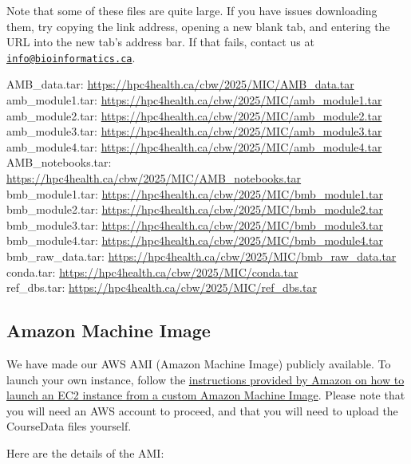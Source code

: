 \documentclass[
]{book}
\begin{document}
Note that some of these files are quite large. If you have issues downloading them, try copying the link address, opening a new blank tab, and entering the URL into the new tab's address bar. If that fails, contact us at \href{mailto:info@bioinformatics.ca}{\nolinkurl{info@bioinformatics.ca}}.

AMB\_data.tar: \url{https://hpc4health.ca/cbw/2025/MIC/AMB_data.tar}\\
amb\_module1.tar: \url{https://hpc4health.ca/cbw/2025/MIC/amb_module1.tar}\\
amb\_module2.tar: \url{https://hpc4health.ca/cbw/2025/MIC/amb_module2.tar}\\
amb\_module3.tar: \url{https://hpc4health.ca/cbw/2025/MIC/amb_module3.tar}\\
amb\_module4.tar: \url{https://hpc4health.ca/cbw/2025/MIC/amb_module4.tar}\\
AMB\_notebooks.tar: \url{https://hpc4health.ca/cbw/2025/MIC/AMB_notebooks.tar}\\
bmb\_module1.tar: \url{https://hpc4health.ca/cbw/2025/MIC/bmb_module1.tar}\\
bmb\_module2.tar: \url{https://hpc4health.ca/cbw/2025/MIC/bmb_module2.tar}\\
bmb\_module3.tar: \url{https://hpc4health.ca/cbw/2025/MIC/bmb_module3.tar}\\
bmb\_module4.tar: \url{https://hpc4health.ca/cbw/2025/MIC/bmb_module4.tar}\\
bmb\_raw\_data.tar: \url{https://hpc4health.ca/cbw/2025/MIC/bmb_raw_data.tar}\\
conda.tar: \url{https://hpc4health.ca/cbw/2025/MIC/conda.tar}\\
ref\_dbs.tar: \url{https://hpc4health.ca/cbw/2025/MIC/ref_dbs.tar}

\subsection{Amazon Machine Image}\label{amazon-machine-image}

We have made our AWS AMI (Amazon Machine Image) publicly available. To launch your own instance, follow the \href{https://repost.aws/knowledge-center/launch-instance-custom-ami}{instructions provided by Amazon on how to launch an EC2 instance from a custom Amazon Machine Image}. Please note that you will need an AWS account to proceed, and that you will need to upload the CourseData files yourself.

Here are the details of the AMI:
\end{document}
